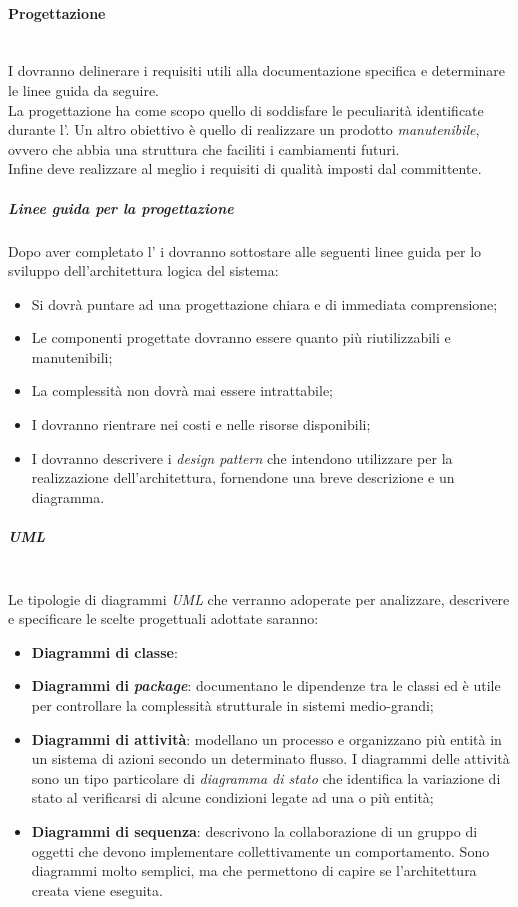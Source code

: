 \paragraph{Progettazione}
	~\\I \progs{} dovranno delinerare i requisiti utili alla documentazione specifica e determinare le linee guida da seguire.
	~\\La progettazione ha come scopo quello di soddisfare le peculiarità identificate durante l'\AdR. Un altro obiettivo è quello di realizzare un prodotto \emph{manutenibile}, ovvero che abbia una struttura che faciliti i cambiamenti futuri.
	\\Infine deve realizzare al meglio i requisiti di qualità imposti dal committente.
	\subparagraph{Linee guida per la progettazione}
	Dopo aver completato l'\AdR{} i \progs{} dovranno sottostare alle seguenti linee guida per lo sviluppo dell'architettura logica del sistema:
	\begin{itemize}
		\item Si dovrà puntare ad una progettazione chiara e di immediata comprensione;
		\item Le componenti progettate dovranno essere quanto più riutilizzabili e manutenibili;
		\item La complessità non dovrà mai essere intrattabile;
		\item I \progs{} dovranno rientrare nei costi e nelle risorse disponibili;
		\item I \progs{} dovranno descrivere i \emph{design pattern} che intendono utilizzare per la realizzazione dell'architettura, fornendone una breve descrizione e un diagramma.
	\end{itemize}
	\subparagraph{UML}
	~\\Le tipologie di diagrammi \emph{UML} che verranno adoperate per analizzare, descrivere e specificare le scelte progettuali adottate saranno:
	\begin{itemize}
		\item \textbf{Diagrammi di classe}:
		\item \textbf{Diagrammi di } \emph{\textbf{package}}: documentano le dipendenze tra le classi ed è utile per controllare la complessità strutturale in sistemi medio-grandi;
		\item \textbf{Diagrammi di attività}: modellano un processo e organizzano più entità in un sistema di azioni secondo un determinato flusso. I diagrammi delle attività sono un tipo particolare di \emph{diagramma di stato} che identifica la variazione di stato al verificarsi di alcune condizioni legate ad una o più entità;
		\item \textbf{Diagrammi di sequenza}: descrivono la collaborazione di un gruppo di oggetti che devono implementare collettivamente un comportamento. Sono diagrammi molto semplici, ma che permettono di capire se l'architettura creata viene eseguita.
	\end{itemize}
\begin{comment}
	\subparagraph{Specifica Tecnica (ST)}
	
	\subparagraph{Definizione di Prodotto (DP)}
\end{comment}
